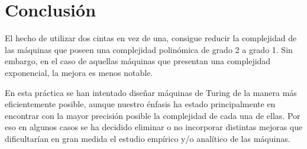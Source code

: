 \documentclass{uc3mpracticas}
\begin{document}
\newpage

\section{Conclusión}

El hecho de utilizar dos cintas en vez de una, consigue reducir la complejidad de las máquinas que poseen una complejidad polinómica de grado 2 a grado 1. Sin embargo, en el caso de aquellas máquinas que presentan una complejidad exponencial, la mejora es menos notable.

\vspace{2mm}

En esta práctica se han intentado diseñar máquinas de Turing de la manera más eficientemente posible, aunque nuestro énfasis ha estado principalmente en encontrar con la mayor precisión posible la complejidad de cada una de ellas. Por eso en algunos casos se ha decidido eliminar o no incorporar distintas mejoras que dificultarían en gran medida el estudio empírico y/o analítico de las máquinas.
\end{document}
